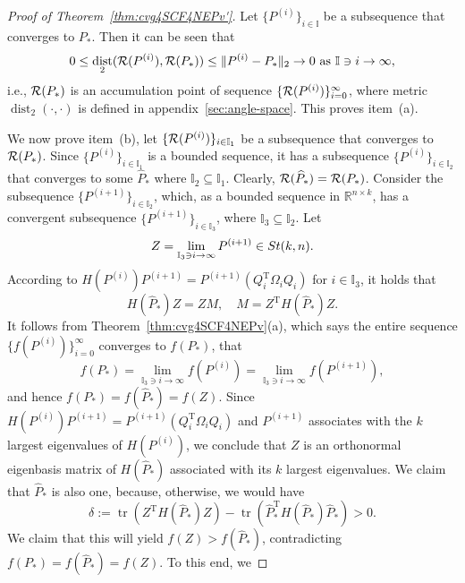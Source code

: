 \documentclass[11pt]{article}
\def\bbI{\mathbb{I}}
\def\bbR{\mathbb{R}}
\def\cR{{\cal R}}
\def\what{\widehat}
\newcommand\STM[2]{{\rm St}(#1,#2)}
\DeclareMathOperator{\dist}{dist}
\DeclareMathOperator{\tr}{tr}
\DeclareMathOperator{\T}{T}
\theoremstyle{definition}
\numberwithin{equation}{section}
\begin{document}
\begin{proof}[Proof of Theorem~\ref{thm:cvg4SCF4NEPv'}]
Let $\{P^{(i)}\}_{i\in\bbI}$ be a subsequence that converges to $P_*$. Then
it can be seen that \cite[pp.125-127]{sun:2001}
\begin{equation}\label{eq:cvg4SCF4NEPv':pf-0'}
0\le\dist_2(\cR(P^{(i)}),\cR(P_*))\le \|P^{(i)}-P_*\|_2\to 0\,\,\mbox{as $\bbI\ni i\to\infty$},
\end{equation}
i.e., $\cR(P_*)$ is an accumulation point of  sequence $\{\cR(P^{(i)})\}_{i=0}^{\infty}$,
where metric $\dist_2(\cdot,\cdot)$ is defined in appendix~\ref{sec:angle-space}. This proves item~(a).

We now prove item~(b), let $\{\cR(P^{(i)})\}_{i\in\bbI_1}$ be a subsequence that converges to $\cR(P_*)$.
Since $\{P^{(i)}\}_{i\in\bbI_1}$ is a bounded sequence, it has a subsequence $\{P^{(i)}\}_{i\in\bbI_2}$
that converges to some $\what P_*$ where $\bbI_2\subseteq\bbI_1$. Clearly,
$\cR(\what P_*)=\cR(P_*)$. Consider the subsequence $\{P^{(i+1)}\}_{i\in\bbI_2}$, which, as a bounded
sequence in $\bbR^{n\times k}$, has a convergent subsequence $\{P^{(i+1)}\}_{i\in\bbI_3}$, where
$\bbI_3\subseteq \bbI_2$. Let
$$
Z=\lim_{\bbI_3\ni i\to\infty}P^{(i+1)}\in \STM{k}{n}.
$$
According to
$H(P^{(i)})P^{(i+1)}=P^{(i+1)}(Q_i^{\T}\Omega_iQ_i)$ for $i\in\bbI_3$,
it holds that
\begin{equation}\label{eq:X*=Z}
H(\what P_*)Z=Z M,\quad M=Z^{\T}H(\what P_*)Z.
\end{equation}
It follows from Theorem~\ref{thm:cvg4SCF4NEPv}(a), which says the entire sequence $\{f(P^{(i)})\}_{i=0}^{\infty}$ converges
to $f(P_*)$, that
\begin{equation}\label{eq:etaequ}
f(P_*)=\lim_{\bbI_3\ni i\to\infty}f(P^{(i)})=\lim_{\bbI_3\ni i\to\infty}f(P^{(i+1)}),
\end{equation}
and hence $f(P_*)=f(\what P_*)=f(Z)$.
Since $H(P^{(i)})P^{(i+1)}=P^{(i+1)}(Q_i^{\T}\Omega_iQ_i)$ and $P^{(i+1)}$
associates  with the $k$ largest eigenvalues of
$H(P^{(i)})$, %
we conclude that $Z$ is an orthonormal eigenbasis matrix of $H(\what P_*)$ associated with its $k$
largest eigenvalues.
We claim that $\what P_*$ is also one,
because, otherwise, we would have
\begin{equation}\label{eq:cvg4SCF4NEPv':pf-5'}
\delta:=\tr(Z^{\T}H(\what P_*)Z)-\tr(\what P_*^{\T}H(\what P_*)\what P_*)>0.
\end{equation}
We claim that this will yield  $f(Z)>f(\what P_*)$, contradicting $f(P_*)=f(\what P_*)=f(Z)$. To this end, we

\end{proof}
\end{document}
